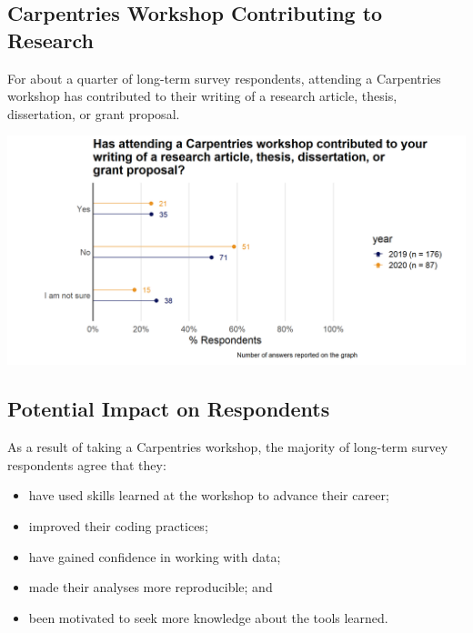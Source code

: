 \documentclass[
]{article}
\makeatletter
\def\maxwidth{\ifdim\Gin@nat@width>\linewidth\linewidth\else\Gin@nat@width\fi}
\providecommand{\tightlist}{%
  \setlength{\itemsep}{0pt}\setlength{\parskip}{0pt}}
\makeatother
\begin{document}
\hypertarget{carpentries-workshop-contributing-to-research}{%
\subsection{Carpentries Workshop Contributing to
Research}\label{carpentries-workshop-contributing-to-research}}

For about a quarter of long-term survey respondents, attending a
Carpentries workshop has contributed to their writing of a research
article, thesis, dissertation, or grant proposal.

\includegraphics[width=\maxwidth]{../figures/2020-12-longterm-workshop_contributed_academics-1}

\hypertarget{potential-impact-on-respondents}{%
\subsection{Potential Impact on
Respondents}\label{potential-impact-on-respondents}}

As a result of taking a Carpentries workshop, the majority of long-term
survey respondents agree that they:

\begin{itemize}
\tightlist
\item
  have used skills learned at the workshop to advance their career;
\item
  improved their coding practices;
\item
  have gained confidence in working with data;
\item
  made their analyses more reproducible; and
\item
  been motivated to seek more knowledge about the tools learned.
\end{itemize}
\end{document}
